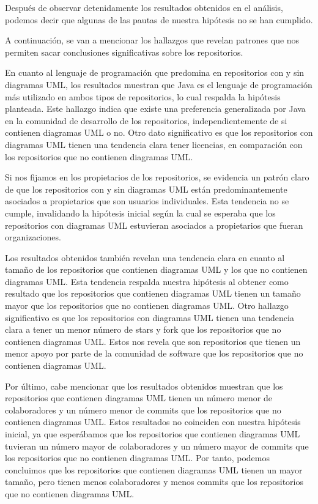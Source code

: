 \documentclass[a4paper, 12pt]{book}
\begin{document}
Después de observar detenidamente los resultados obtenidos en el análisis, podemos decir que algunas de las pautas de nuestra hipótesis no se han cumplido.


A continuación, se van a mencionar los hallazgos que revelan patrones que nos permiten sacar conclusiones significativas sobre los repositorios.

En cuanto al lenguaje de programación que predomina en repositorios con y sin diagramas UML, los resultados muestran que Java es el lenguaje de programación más utilizado en ambos tipos de repositorios, lo cual respalda la hipótesis planteada.
Este hallazgo indica que existe una preferencia generalizada por Java en la comunidad de desarrollo de los repositorios, independientemente de si contienen diagramas UML o no.
Otro dato significativo es que los repositorios con diagramas UML tienen una tendencia clara tener licencias, en comparación con los repositorios que no contienen diagramas UML.


Si nos fijamos en los propietarios de los repositorios, se evidencia un patrón claro de que los repositorios con y sin diagramas UML están predominantemente asociados a propietarios que son usuarios individuales.
Esta tendencia no se cumple, invalidando la hipótesis inicial según la cual se esperaba que los repositorios con diagramas UML estuvieran asociados a propietarios que fueran organizaciones.


Los resultados obtenidos también revelan una tendencia clara en cuanto al tamaño de los repositorios que contienen diagramas UML y los que no contienen diagramas UML.
Esta tendencia respalda nuestra hipótesis al obtener como resultado que los repositorios que contienen diagramas UML tienen un tamaño mayor que los repositorios que no contienen diagramas UML.
Otro hallazgo significativo es que los repositorios con diagramas UML tienen una tendencia clara a tener un menor número de stars y fork que los repositorios que no contienen diagramas UML.
Estos nos revela que son repositorios que tienen un menor apoyo por parte de la comunidad de software que los repositorios que no contienen diagramas UML.


Por último, cabe mencionar que los resultados obtenidos muestran que los repositorios que contienen diagramas UML tienen un número menor de colaboradores y un número menor de commits que los repositorios que no contienen diagramas UML.
Estos resultados no coinciden con nuestra hipótesis inicial, ya que esperábamos que los repositorios que contienen diagramas UML tuvieran un número mayor de colaboradores y un número mayor de commits que los repositorios que no contienen diagramas UML.
Por tanto, podemos concluimos que los repositorios que contienen diagramas UML tienen un mayor tamaño, pero tienen menos colaboradores y menos commits que los repositorios que no contienen diagramas UML.
\end{document}
